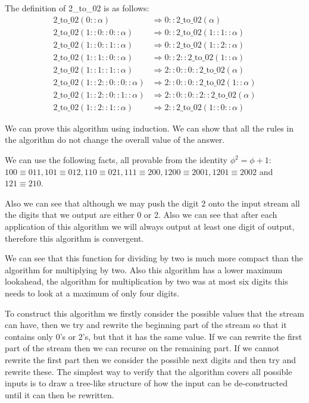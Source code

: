 \documentclass{cs4rep}
\begin{document}
The definition of 2\_to\_02 is as follows:
\[ \begin{array}{ll}
\mbox{2\_to\_02}(0::\alpha) & \Rightarrow 0::\mbox{2\_to\_02}(\alpha) \\
\mbox{2\_to\_02}(1::0::0::\alpha) & \Rightarrow 0::\mbox{2\_to\_02}(1::1::\alpha) \\
\mbox{2\_to\_02}(1::0::1::\alpha) & \Rightarrow 0::\mbox{2\_to\_02}(1::2::\alpha) \\
\mbox{2\_to\_02}(1::1::0::\alpha) & \Rightarrow 0::2::\mbox{2\_to\_02}(1::\alpha) \\
\mbox{2\_to\_02}(1::1::1::\alpha) & \Rightarrow 2::0::0::\mbox{2\_to\_02}(\alpha) \\
\mbox{2\_to\_02}(1::2::0::0::\alpha) & \Rightarrow 2::0::0::\mbox{2\_to\_02}(1::\alpha) \\
\mbox{2\_to\_02}(1::2::0::1::\alpha) & \Rightarrow 2::0::0::2::\mbox{2\_to\_02}(\alpha) \\
\mbox{2\_to\_02}(1::2::1::\alpha) & \Rightarrow 2::\mbox{2\_to\_02}(1::0::\alpha)
\end{array} \] 

We can prove this algorithm using induction. We can show that all the
rules in the algorithm do not change the overall value of the answer.

We can use the following facts, all provable from the identity
$\phi^{2}=\phi+1$: $100 \equiv 011,101 \equiv 012,110 \equiv 021,111
\equiv 200,1200 \equiv 2001,1201 \equiv 2002$ and $121 \equiv 210$.

Also we can see that although we may push the digit 2 onto the input
stream all the digits that we output are either 0 or 2. Also we can
see that after each application of this algorithm we will always
output at least one digit of output, therefore this algorithm is
convergent.

We can see that this function for dividing by two is much more compact
than the algorithm for multiplying by two. Also this algorithm has a
lower maximum lookahead, the algorithm for multiplication by two was
at most six digits this needs to look at a maximum of only four
digits.

To construct this algorithm we firstly consider the possible values
that the stream can have, then we try and rewrite the beginning part
of the stream so that it contains only 0's or 2's, but that it has the
same value. If we can rewrite the first part of the stream then we can
recurse on the remaining part. If we cannot rewrite the first part
then we consider the possible next digits and then try and rewrite
these. The simplest way to verify that the algorithm covers all
possible inputs is to draw a tree-like structure of how the input can
be de-constructed until it can then be rewritten.
\end{document}
